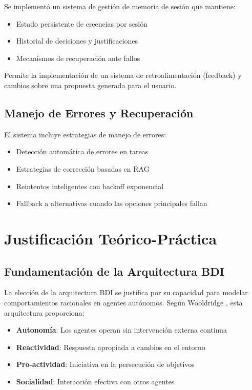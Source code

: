 \documentclass[runningheads,a4paper]{llncs}
\begin{document}
Se implementó un sistema de gestión de memoria de sesión que mantiene:

\begin{itemize}
    \item Estado persistente de creencias por sesión
    \item Historial de decisiones y justificaciones
    \item Mecanismos de recuperación ante fallos
\end{itemize}

Permite la implementación de un sistema de retroalimentación (feedback) y cambios sobre una propuesta generada para el usuario.

\subsection{Manejo de Errores y Recuperación}

El sistema incluye estrategias de manejo de errores:

\begin{itemize}
    \item Detección automática de errores en tareas
    \item Estrategias de corrección basadas en RAG
    \item Reintentos inteligentes con backoff exponencial
    \item Fallback a alternativas cuando las opciones principales fallan
\end{itemize}

\section{Justificación Teórico-Práctica}

\subsection{Fundamentación de la Arquitectura BDI}

La elección de la arquitectura BDI se justifica por su capacidad para modelar comportamientos racionales en agentes autónomos. Según Wooldridge \cite{wooldridge2009introduction}, esta arquitectura proporciona:

\begin{itemize}
    \item \textbf{Autonomía}: Los agentes operan sin intervención externa continua
    \item \textbf{Reactividad}: Respuesta apropiada a cambios en el entorno
    \item \textbf{Pro-actividad}: Iniciativa en la persecución de objetivos
    \item \textbf{Socialidad}: Interacción efectiva con otros agentes
\end{itemize}
\end{document}
